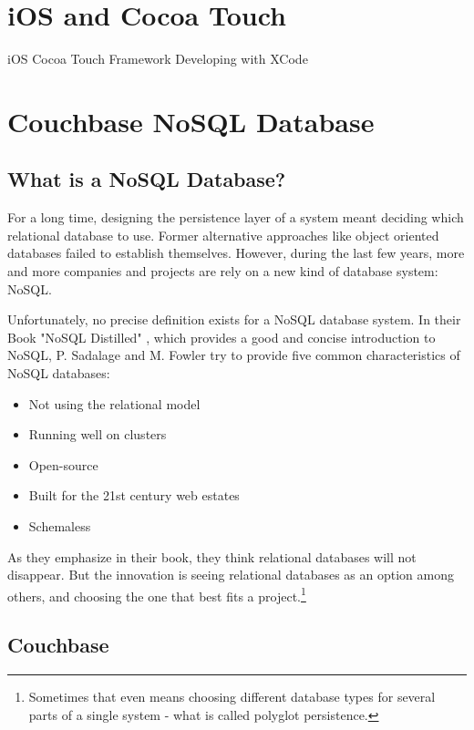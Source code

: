 \section{iOS and Cocoa Touch}

iOS Cocoa Touch Framework 
Developing with XCode

\section{Couchbase NoSQL Database}


\subsection{What is a NoSQL Database?}

For a long time, designing the persistence layer of a system meant deciding which relational database to use. Former alternative approaches like object oriented databases failed to establish themselves. 
However, during the last few years, more and more companies and projects are rely on a new kind of database system: NoSQL.

Unfortunately, no precise definition exists for a NoSQL database system. In their Book "NoSQL Distilled" \cite{nosqldistilled}, which provides a good and concise introduction to NoSQL, P. Sadalage and M. Fowler try to provide five common characteristics of NoSQL databases:

\begin{itemize}
\item Not using the relational model
\item Running well on clusters
\item Open-source
\item Built for the 21st century web estates
\item Schemaless
\end{itemize}

As they emphasize in their book, they think relational databases will not disappear. But the innovation is seeing relational databases as an option among others, and choosing the one that best fits a project.\footnote{Sometimes that even means choosing different database types for several parts of a single system - what is called polyglot persistence.} 

\subsection{Couchbase}

